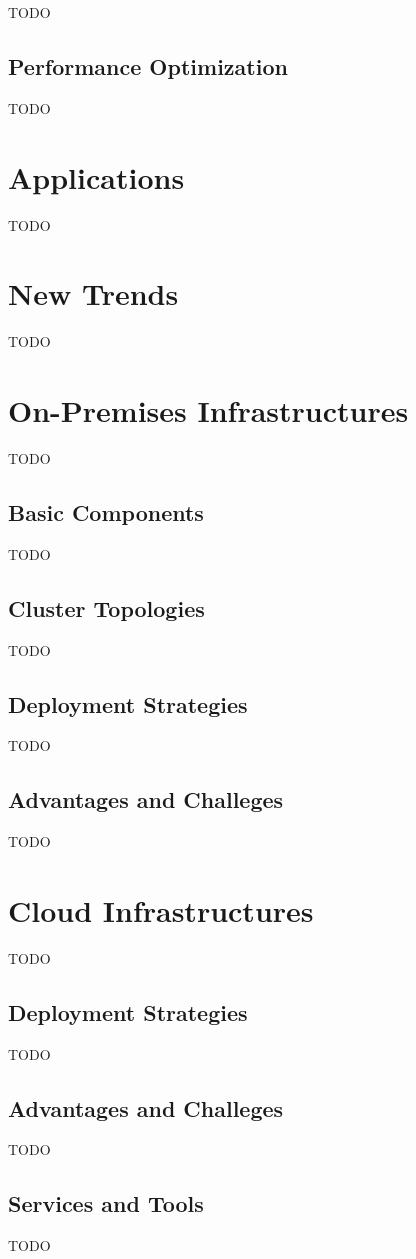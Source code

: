 TODO

\subsection{Performance Optimization}

TODO

\section{Applications}

TODO

\section{New Trends}

TODO

\section{On-Premises Infrastructures}

TODO

\subsection{Basic Components}

TODO

\subsection{Cluster Topologies}

TODO

\subsection{Deployment Strategies}

TODO

\subsection{Advantages and Challeges}

TODO

\section{Cloud Infrastructures}

TODO

\subsection{Deployment Strategies}

TODO

\subsection{Advantages and Challeges}

TODO

\subsection{Services and Tools}

TODO
